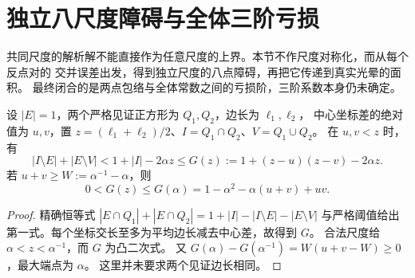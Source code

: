 \section{独立八尺度障碍与全体三阶亏损}\label{ic:section}
共同尺度的解析解不能直接作为任意尺度的上界。本节不作尺度对称化，而从每个反点对的
交并误差出发，得到独立尺度的八点障碍，再把它传递到真实光晕的面积。
最终闭合的是两点包络与全体常数之间的亏损阶，三阶系数本身仍未确定。

\begin{lemma}[两点交并的误差预算]\label{ic:pair}
设 $|E|=1$，两个严格见证正方形为 $Q_1,Q_2$，边长为 $\ell_1,\ell_2$，
中心坐标差的绝对值为 $u,v$，置 $z=(\ell_1+\ell_2)/2$、$I=Q_1\cap Q_2$、$V=Q_1\cup Q_2$。
在 $u,v<z$ 时，有
\[
 |I\setminus E|+|E\setminus V|
 <1+|I|-2\alpha z
 \le G(z):=1+(z-u)(z-v)-2\alpha z.
\]
若 $u+v\ge W:=\alpha^{-1}-\alpha$，则
\[
 0<G(z)\le G(\alpha)=1-\alpha^2-\alpha(u+v)+uv.
\]
\end{lemma}
\begin{proof}
精确恒等式
$|E\cap Q_1|+|E\cap Q_2|=1+|I|-|I\setminus E|-|E\setminus V|$
与严格阈值给出第一式。每个坐标交长至多为平均边长减去中心差，故得到 $G$。
合法尺度给 $\alpha<z<\alpha^{-1}$，而 $G$ 为凸二次式。
又 $G(\alpha)-G(\alpha^{-1})=W(u+v-W)\ge0$，最大端点为 $\alpha$。
这里并未要求两个见证边长相同。
\end{proof}

